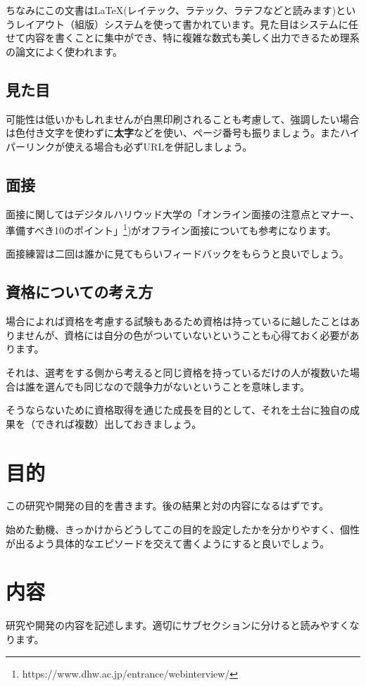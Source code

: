 \documentclass[dvipdfmx, a4paper]{jsarticle}
\begin{document}
ちなみにこの文書は\LaTeX(レイテック、ラテック、ラテフなどと読みます)というレイアウト（組版）システムを使って書かれています。見た目はシステムに任せて内容を書くことに集中ができ、特に複雑な数式も美しく出力できるため理系の論文によく使われます。

\subsection{見た目}
可能性は低いかもしれませんが白黒印刷されることも考慮して、強調したい場合は色付き文字を使わずに\textbf{太字}などを使い、ページ番号も振りましょう。またハイパーリンクが使える場合も必ずURLを併記しましょう。

\subsection{面接}
面接に関してはデジタルハリウッド大学の「オンライン面接の注意点とマナー、準備すべき10のポイント」\footnote{https://www.dhw.ac.jp/entrance/webinterview/})がオフライン面接についても参考になります。

面接練習は二回は誰かに見てもらいフィードバックをもらうと良いでしょう。

\subsection{資格についての考え方}
場合によれば資格を考慮する試験もあるため資格は持っているに越したことはありませんが、資格には自分の色がついていないということも心得ておく必要があります。

それは、選考をする側から考えると同じ資格を持っているだけの人が複数いた場合は誰を選んでも同じなので競争力がないということを意味します。

そうならないために資格取得を通じた成長を目的として、それを土台に独自の成果を（できれば複数）出しておきましょう。

\section{目的}
この研究や開発の目的を書きます。後の結果と対の内容になるはずです。

始めた動機、きっかけからどうしてこの目的を設定したかを分かりやすく、個性が出るよう具体的なエピソードを交えて書くようにすると良いでしょう。

\section{内容}
研究や開発の内容を記述します。適切にサブセクションに分けると読みやすくなります。
\end{document}
